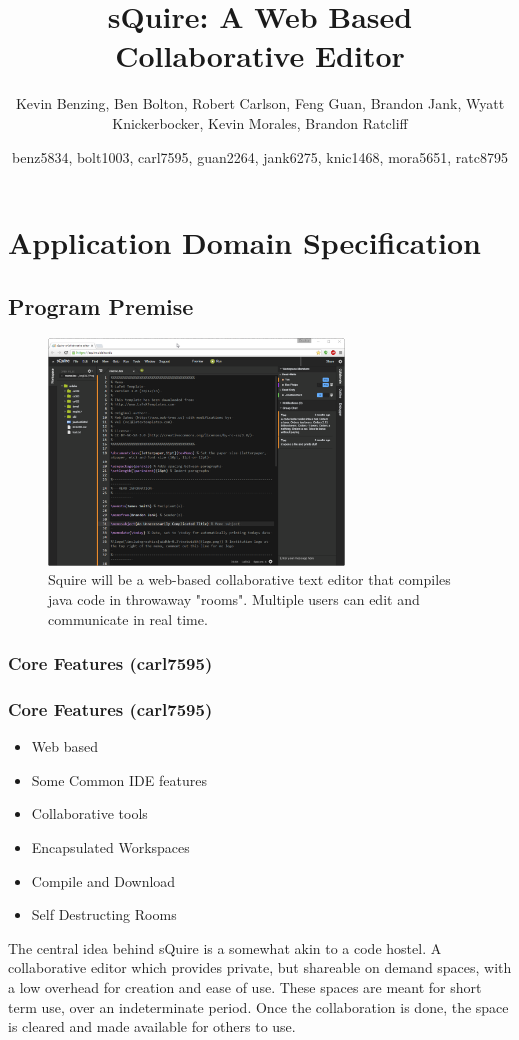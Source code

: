 \documentclass[11pt]{report}
\title{sQuire: A Web Based Collaborative Editor}
\author{Kevin Benzing, Ben Bolton, Robert Carlson, Feng Guan, Brandon Jank, Wyatt Knickerbocker, Kevin Morales, Brandon Ratcliff}
\author{benz5834, bolt1003, carl7595, guan2264, jank6275, knic1468, mora5651, ratc8795}
\begin{document}
\maketitle

\tableofcontents

\chapter{Application Domain Specification}

\section{Program Premise}
\begin{figure}[h!]
\caption{Squire will be a web-based collaborative text editor that compiles java code in throwaway "rooms". Multiple users can edit and communicate in real time.}
\includegraphics[width=0.7\textwidth]{squire}
\end{figure}

\subsection{Core Features (carl7595)}
\subsection{Core Features (carl7595)}
\begin{itemize}
  \item Web based
  \item Some Common IDE features
  \item Collaborative tools
  \item Encapsulated Workspaces
  \item Compile and Download
  \item Self Destructing Rooms
\end{itemize}
The central idea behind sQuire is a somewhat akin to a code hostel. A collaborative editor which provides private, but shareable on demand spaces, with a low overhead for creation and ease of use. These spaces are meant for short term use, over an indeterminate period. Once the collaboration is done, the space is cleared and made available for others to use.
\end{document}
